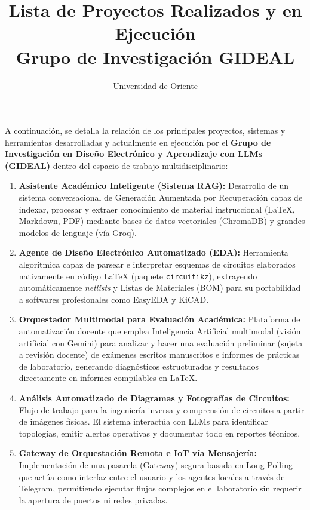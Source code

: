\documentclass[12pt, a4paper]{article}
\title{\textbf{Lista de Proyectos Realizados y en Ejecución}\\Grupo de Investigación GIDEAL}
\author{Universidad de Oriente \vspace{-0.5cm}}
\date{}
\begin{document}
\maketitle

\noindent
A continuación, se detalla la relación de los principales proyectos, sistemas y herramientas desarrolladas y actualmente en ejecución por el \textbf{Grupo de Investigación en Diseño Electrónico y Aprendizaje con LLMs (GIDEAL)} dentro del espacio de trabajo multidisciplinario:

\vspace{0.5cm}

\begin{enumerate}[label=\textbf{\arabic*.}, leftmargin=*]
    \setlength\itemsep{1em}
    
    \item \textbf{Asistente Académico Inteligente (Sistema RAG):} 
    Desarrollo de un sistema conversacional de Generación Aumentada por Recuperación capaz de indexar, procesar y extraer conocimiento de material instruccional (LaTeX, Markdown, PDF) mediante bases de datos vectoriales (ChromaDB) y grandes modelos de lenguaje (vía Groq).

    \item \textbf{Agente de Diseño Electrónico Automatizado (EDA):} 
    Herramienta algorítmica capaz de parsear e interpretar esquemas de circuitos elaborados nativamente en código LaTeX (paquete \texttt{circuitikz}), extrayendo automáticamente \textit{netlists} y Listas de Materiales (BOM) para su portabilidad a softwares profesionales como EasyEDA y KiCAD.

    \item \textbf{Orquestador Multimodal para Evaluación Académica:} 
    Plataforma de automatización docente que emplea Inteligencia Artificial multimodal (visión artificial con Gemini) para analizar y hacer una evaluación preliminar (sujeta a revisión docente) de exámenes escritos manuscritos e informes de prácticas de laboratorio, generando diagnósticos estructurados y resultados directamente en informes compilables en LaTeX.

    \item \textbf{Análisis Automatizado de Diagramas y Fotografías de Circuitos:} 
    Flujo de trabajo para la ingeniería inversa y comprensión de circuitos a partir de imágenes físicas. El sistema interactúa con LLMs para identificar topologías, emitir alertas operativas y documentar todo en reportes técnicos.

    \item \textbf{Gateway de Orquestación Remota e IoT vía Mensajería:} 
    Implementación de una pasarela (Gateway) segura basada en Long Polling que actúa como interfaz entre el usuario y los agentes locales a través de Telegram, permitiendo ejecutar flujos complejos en el laboratorio sin requerir la apertura de puertos ni redes privadas.


\end{enumerate}
\end{document}
